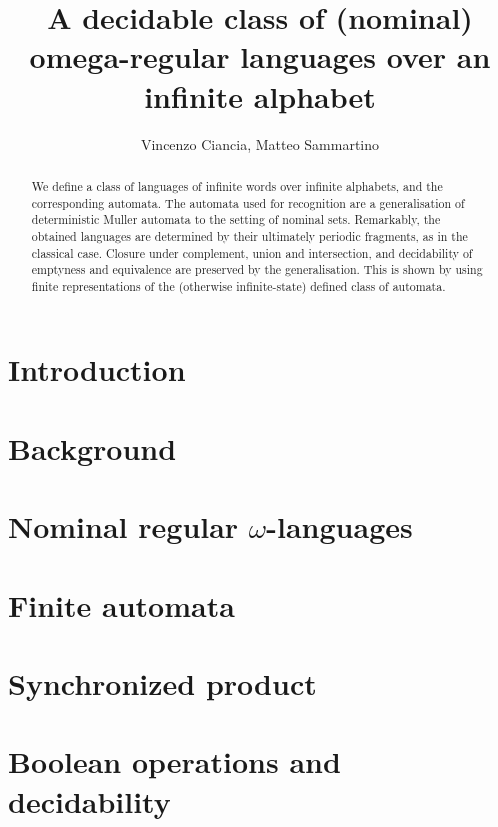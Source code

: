 \documentclass[orivec]{llncs}
\title{A decidable class of (nominal) omega-regular languages over an infinite alphabet}
\author{Vincenzo Ciancia, Matteo Sammartino}
\institute{}
\begin{document}
\maketitle

\begin{abstract}
 We define a class of languages of infinite words over infinite alphabets, and the corresponding automata. The automata used for recognition are a generalisation of deterministic Muller automata to the setting of nominal sets. Remarkably, the obtained languages are determined by their ultimately periodic fragments, as in the classical case. Closure under complement, union and intersection, and decidability of emptyness and equivalence are preserved by the generalisation. This is shown by using finite representations of the (otherwise infinite-state) defined class of automata.
\end{abstract}

\section{Introduction}\label{sec:introduction}

\section{Background}\label{sec:background}

\section{Nominal regular $\omega$-languages}\label{sec:languages}


\section{Finite automata}\label{sec:hd-automata}



\section{Synchronized product}\label{sec:sync-product}


\section{Boolean operations and decidability}\label{sec:boolean-operations-decidability}
\end{document}
